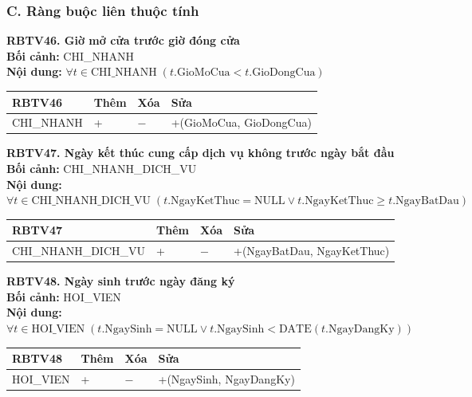 \documentclass[11pt, a4paper]{article}
\begin{document}
\subsubsection{C. Ràng buộc liên thuộc tính}

\textbf{RBTV46. Giờ mở cửa trước giờ đóng cửa} \\
\textbf{Bối cảnh:} CHI\_NHANH \\
\textbf{Nội dung:} $\forall t \in \text{CHI\_NHANH} \; (t.\text{GioMoCua} < t.\text{GioDongCua})$

\vspace{0.3em}
\begin{small}
\begin{tabularx}{\textwidth}{| C{4.2cm} | C{2cm} | C{2cm} | Y |}
\hline
\textbf{RBTV46} & \textbf{Thêm} & \textbf{Xóa} & \textbf{Sửa} \\
\hline
CHI\_NHANH & + & $-$ & +(GioMoCua, GioDongCua) \\
\hline
\end{tabularx}
\end{small}

\vspace{0.8em}
\textbf{RBTV47. Ngày kết thúc cung cấp dịch vụ không trước ngày bắt đầu} \\
\textbf{Bối cảnh:} CHI\_NHANH\_DICH\_VU \\
\textbf{Nội dung:} $\forall t \in \text{CHI\_NHANH\_DICH\_VU} \; (t.\text{NgayKetThuc} = \text{NULL} \lor t.\text{NgayKetThuc} \ge t.\text{NgayBatDau})$

\vspace{0.3em}
\begin{small}
\begin{tabularx}{\textwidth}{| C{4.2cm} | C{2cm} | C{2cm} | Y |}
\hline
\textbf{RBTV47} & \textbf{Thêm} & \textbf{Xóa} & \textbf{Sửa} \\
\hline
CHI\_NHANH\_DICH\_VU & + & $-$ & +(NgayBatDau, NgayKetThuc) \\
\hline
\end{tabularx}
\end{small}

\vspace{0.8em}
\textbf{RBTV48. Ngày sinh trước ngày đăng ký} \\
\textbf{Bối cảnh:} HOI\_VIEN \\
\textbf{Nội dung:} $\forall t \in \text{HOI\_VIEN} \; (t.\text{NgaySinh} = \text{NULL} \lor t.\text{NgaySinh} < \text{DATE}(t.\text{NgayDangKy}))$

\vspace{0.3em}
\begin{small}
\begin{tabularx}{\textwidth}{| C{4.2cm} | C{2cm} | C{2cm} | Y |}
\hline
\textbf{RBTV48} & \textbf{Thêm} & \textbf{Xóa} & \textbf{Sửa} \\
\hline
HOI\_VIEN & + & $-$ & +(NgaySinh, NgayDangKy) \\
\hline
\end{tabularx}
\end{small}
\end{document}
